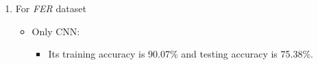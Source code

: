 \begin{enumerate}
\item For \textit{FER} dataset \newline
\begin{itemize}
    \item Only CNN: 
        \begin{itemize}
            \item Its training accuracy is 90.07\% and testing accuracy is 75.38\%.
        \end{itemize}

	\begin{comment}
    \item Only HOG: 
        \begin{itemize}
            \item It takes X time in training and X time in testing.
            \item The model size was 966 KB.
            \item Its training accuracy is 72.33\% and testing accuracy is 53.9\%.
        \end{itemize}
    \item Only landmarks: 
        \begin{itemize}
            \item It takes X time in training and X time in testing.
            \item The model size was X.
            \item Its training accuracy is X and testing accuracy is X.
        \end{itemize}
	\end{comment}


\end{itemize}
\end{enumerate}
